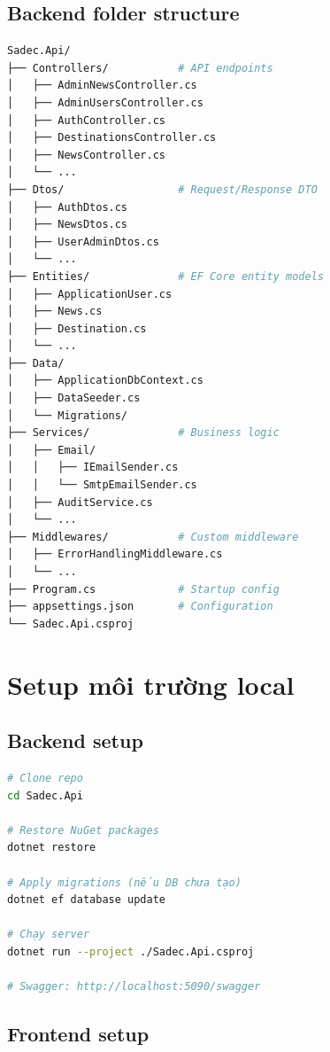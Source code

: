 \documentclass[12pt,a4paper,oneside]{report}
\begin{document}
\subsection{Backend folder structure}

\begin{lstlisting}[language=bash,caption={Cấu trúc Sadec.Api/ backend}]
Sadec.Api/
├── Controllers/           # API endpoints
│   ├── AdminNewsController.cs
│   ├── AdminUsersController.cs
│   ├── AuthController.cs
│   ├── DestinationsController.cs
│   ├── NewsController.cs
│   └── ...
├── Dtos/                  # Request/Response DTO
│   ├── AuthDtos.cs
│   ├── NewsDtos.cs
│   ├── UserAdminDtos.cs
│   └── ...
├── Entities/              # EF Core entity models
│   ├── ApplicationUser.cs
│   ├── News.cs
│   ├── Destination.cs
│   └── ...
├── Data/
│   ├── ApplicationDbContext.cs
│   ├── DataSeeder.cs
│   └── Migrations/
├── Services/              # Business logic
│   ├── Email/
│   │   ├── IEmailSender.cs
│   │   └── SmtpEmailSender.cs
│   ├── AuditService.cs
│   └── ...
├── Middlewares/           # Custom middleware
│   ├── ErrorHandlingMiddleware.cs
│   └── ...
├── Program.cs             # Startup config
├── appsettings.json       # Configuration
└── Sadec.Api.csproj
\end{lstlisting}

\section{Setup môi trường local}

\subsection{Backend setup}

\begin{lstlisting}[language=bash,caption={Chạy backend local}]
# Clone repo
cd Sadec.Api

# Restore NuGet packages
dotnet restore

# Apply migrations (nếu DB chưa tạo)
dotnet ef database update

# Chạy server
dotnet run --project ./Sadec.Api.csproj

# Swagger: http://localhost:5090/swagger
\end{lstlisting}

\subsection{Frontend setup}
\end{document}
